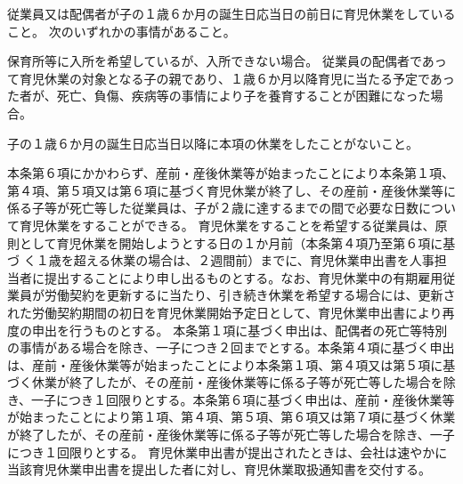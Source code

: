 \documentclass[10pt,a4paper,uplatex]{jsarticle}
\begin{document}
\begin{enumerate}
    \itm 従業員又は配偶者が子の１歳６か月の誕生日応当日の前日に育児休業をしていること。
    \itm 次のいずれかの事情があること。
    \begin{enumerate}
        \itm 保育所等に入所を希望しているが、入所できない場合。
        \itm 従業員の配偶者であって育児休業の対象となる子の親であり、１歳６か月以降育児に当たる予定であった者が、死亡、負傷、疾病等の事情により子を養育することが困難になった場合。
    \end{enumerate}
    \itm 子の１歳６か月の誕生日応当日以降に本項の休業をしたことがないこと。
\end{enumerate}
\term 本条第６項にかかわらず、産前・産後休業等が始まったことにより本条第１項、第４項、第５項又は第６項に基づく育児休業が終了し、その産前・産後休業等に係る子等が死亡等した従業員は、子が２歳に達するまでの間で必要な日数について育児休業をすることができる。
\term 育児休業をすることを希望する従業員は、原則として育児休業を開始しようとする日の１か月前（本条第４項乃至第６項に基づ
く１歳を超える休業の場合は、２週間前）までに、育児休業申出書を人事担当者に提出することにより申し出るものとする。なお、育児休業中の有期雇用従業員が労働契約を更新するに当たり、引き続き休業を希望する場合には、更新された労働契約期間の初日を育児休業開始予定日として、育児休業申出書により再度の申出を行うものとする。
\term 本条第１項に基づく申出は、配偶者の死亡等特別の事情がある場合を除き、一子につき２回までとする。本条第４項に基づく申出は、産前・産後休業等が始まったことにより本条第１項、第４項又は第５項に基づく休業が終了したが、その産前・産後休業等に係る子等が死亡等した場合を除き、一子につき１回限りとする。本条第６項に基づく申出は、産前・産後休業等が始まったことにより第１項、第４項、第５項、第６項又は第７項に基づく休業が終了したが、その産前・産後休業等に係る子等が死亡等した場合を除き、一子につき１回限りとする。
\term 育児休業申出書が提出されたときは、会社は速やかに当該育児休業申出書を提出した者に対し、育児休業取扱通知書を交付する。
\end{document}
